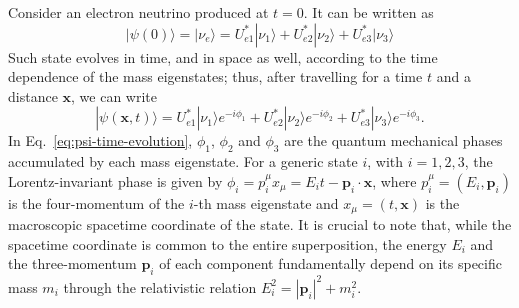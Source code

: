 Consider an electron neutrino produced at $t=0$. It can be written as 
\begin{equation*}
    | \psi(0) \rangle = | \nu_e \rangle = U_{e1}^* | \nu_1 \rangle + U_{e2}^* | \nu_2 \rangle + U_{e3}^* | \nu_3 \rangle
\end{equation*}
Such state evolves in time, and in space as well, according to the time dependence of the mass eigenstates; thus, after travelling for a time $t$ and a distance $\mathbf{x}$, we can write
\begin{equation}
    \label{eq:psi-time-evolution}
    | \psi(\mathbf{x}, t) \rangle = U_{e1}^* | \nu_1 \rangle e^{-i\phi_1} + U_{e2}^* | \nu_2 \rangle e^{-i\phi_2} + U_{e3}^* | \nu_3 \rangle e^{-i\phi_3}.
\end{equation}
In Eq.~\ref{eq:psi-time-evolution}, $\phi_1$, $\phi_2$ and $\phi_3$ are the quantum mechanical phases accumulated by each mass eigenstate.
For a generic state $i$, with $i = 1, 2, 3$, the Lorentz-invariant phase is given by $\phi_i = p^\mu_i x_\mu = E_i t - \mathbf{p}_i \cdot \mathbf{x}$, where $p^\mu_i = (E_i, \mathbf{p}_i)$
is the four-momentum of the $i$-th mass eigenstate and $x_\mu = (t, \mathbf{x})$ is the macroscopic spacetime coordinate of the state.
It is crucial to note that, while the spacetime coordinate is common to the entire superposition, 
the energy $E_i$ and the three-momentum $\mathbf{p}_i$ of each component fundamentally depend on its specific mass $m_i$ through the relativistic 
relation $E_i^2 = |\mathbf{p}_i|^2 + m_i^2$.

